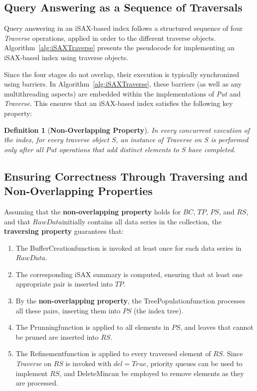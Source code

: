 \documentclass[a4paper,11pt,twoside,openany]{book}
\newtheorem{definition}{Definition}
\newcommand{\DeleteMin}{\mbox{\sc DeleteMin}}
\newcommand{\BufferCreation}{\mbox{\sc BufferCreation}}
\newcommand{\TreePopulation}{\mbox{\sc TreePopulation}}
\newcommand{\Prunning}{\mbox{\sc Prunning}}
\newcommand{\Refinement}{\mbox{\sc Refinement}}
\newcommand{\RawData}{\mbox{$\mathit{RawData}$}}
\begin{document}
\subsection{Query Answering as a Sequence of Traversals}

Query answering in an iSAX-based index follows a structured sequence of four
\textit{Traverse} operations, applied in order to the different traverse objects.  
Algorithm~\ref{alg:iSAXTraverse} presents the pseudocode for implementing an iSAX-based index
using traverse objects.

Since the four stages do not overlap, their execution is typically synchronized
using barriers. In Algorithm~\ref{alg:iSAXTraverse}, these barriers (as well as any 
multithreading aspects) are embedded within the implementations of \textit{Put}
and \textit{Traverse}. This ensures that an iSAX-based index satisfies the
following key property:

\begin{definition}[\textbf{Non-Overlapping Property}]
\label{def:non-overlapping}
In every concurrent execution of the index, for every traverse object $S$, an
instance of \textit{Traverse} on $S$ is performed only after all \textit{Put}
operations that add distinct elements to $S$ have completed.
\end{definition}

\subsection{Ensuring Correctness Through Traversing and Non-Overlapping Properties}

Assuming that the \textbf{non-overlapping property} holds for $BC$, $TP$, $PS$,
and $RS$, and that \RawData initially contains all data series in the collection,
the \textbf{traversing property} guarantees that:

\begin{enumerate}
    \item The \BufferCreation function is invoked at least once for each data
     series in \RawData.
    \item The corresponding iSAX summary is computed, ensuring that at least one
     appropriate pair is inserted into $TP$.
    \item By the \textbf{non-overlapping property}, the \TreePopulation function
     processes all these pairs, inserting them into $PS$ (the index tree).
    \item The \Prunning function is applied to all elements in $PS$, and leaves
     that cannot be pruned are inserted into $RS$.
    \item The \Refinement function is applied to every traversed element of $RS$.
     Since \textit{Traverse} on $RS$ is invoked with $del = \mathit{True}$,
    priority queues can be used to implement $RS$, and \DeleteMin can be employed
    to remove elements as they are processed.
\end{enumerate}
\end{document}
